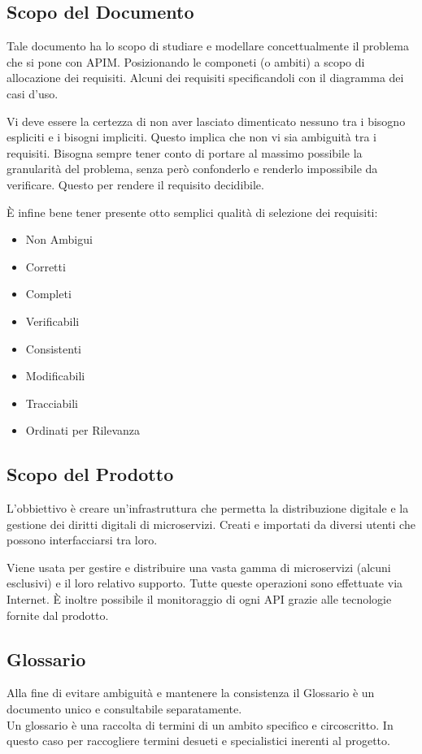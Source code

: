 \documentclass[12pt,a4paper,titlepage]{article}
\begin{document}
\subsection{Scopo del Documento}
Tale documento ha lo scopo di studiare e modellare concettualmente il problema che si pone con APIM. Posizionando le componeti (o ambiti) a scopo di allocazione dei requisiti. Alcuni dei requisiti specificandoli con il diagramma dei casi d'uso.

Vi deve essere la certezza di non aver lasciato dimenticato nessuno tra i bisogno espliciti e i bisogni impliciti. Questo implica che non vi sia ambiguità tra i requisiti.
Bisogna sempre tener conto di portare al massimo possibile la granularità del problema, senza però confonderlo e renderlo impossibile da verificare. Questo per rendere il requisito decidibile.

È infine bene tener presente otto semplici qualità di selezione dei requisiti:
\begin{itemize}
\item Non Ambigui
\item Corretti
\item Completi
\item Verificabili
\item Consistenti
\item Modificabili
\item Tracciabili
\item Ordinati per Rilevanza
\end{itemize}
\subsection{Scopo del Prodotto}
L'obbiettivo è creare un'infrastruttura che permetta la distribuzione digitale e la gestione dei diritti digitali di microservizi. Creati e importati da diversi utenti che possono interfacciarsi tra loro.

Viene usata per gestire e distribuire una vasta gamma di microservizi (alcuni esclusivi) e il loro relativo supporto. Tutte queste operazioni sono effettuate via Internet.
È inoltre possibile il monitoraggio di ogni API grazie alle tecnologie fornite dal prodotto. 
\subsection{Glossario}
Alla fine di evitare ambiguità e mantenere la consistenza il Glossario è un documento unico e consultabile separatamente. \\
Un glossario è una raccolta di termini di un ambito specifico e circoscritto. In questo caso per raccogliere termini desueti e specialistici inerenti al progetto. 
\\
\end{document}
